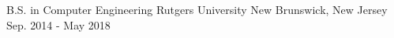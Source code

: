 \begin{cventries}
  \cventry
    {B.S. in Computer Engineering}
    {Rutgers University}
    {New Brunswick, New Jersey}
    {Sep. 2014 - May 2018}
    {
      \begin{cvitems}
      \end{cvitems}
    }
\end{cventries}
